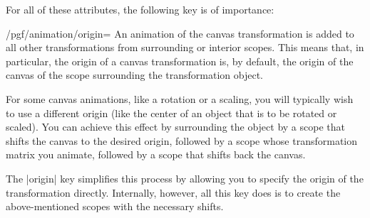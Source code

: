 For all of these attributes, the following key is of importance:
%
\begin{key}{/pgf/animation/origin=}
    An animation of the canvas transformation is added to all other
    transformations from surrounding or interior scopes. This means that, in
    particular, the origin of a canvas transformation is, by default, the
    origin of the canvas of the scope surrounding the transformation object.

    For some canvas animations, like a rotation or a scaling, you will
    typically wish to use a different origin (like the center of an object that
    is to be rotated or scaled). You can achieve this effect by surrounding the
    object by a scope that shifts the canvas to the desired origin, followed by
    a scope whose transformation matrix you animate, followed by a scope that
    shifts back the canvas.

    The |origin| key simplifies this process by allowing you to specify the
    origin of the transformation directly. Internally, however, all this key
    does is to create the above-mentioned scopes with the necessary shifts.
\begin{codeexample}[animation list={0.5,1,1.5,2}]
\end{codeexample}
\end{key}

